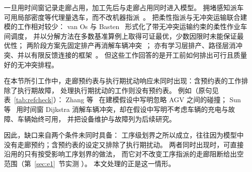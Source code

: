 一旦用时间窗记录走廊占用，加工先后与走廊占用同时进入模型。
拥堵感知派车可用局部密度等代理量选车，而不改机器指派~\cite{kim2026congestion}。
把柔性指派与无冲突运输联合建模的工作相对较少：
van Os 与 Basten~\cite{vanos2026exact} 形式化了带无冲突运输约束的柔性作业车间调度，
并以分解方法在多数基准算例上取得可证最优，少数因限时未能保证最优性；
两阶段方案先固定排产再消解车辆冲突~\cite{sun2023integrated}；
亦有学习层排产、路径层消冲突、并以有限反馈连接的框架~\cite{li2026framework}。
但这些工作回答的是开工前如何排出可行且质量好的无冲突排程。

在本节所引工作中，走廊预约表与执行期扰动响应未同时出现：含预约表的工作排除了执行期故障，
处理执行期扰动的工作则没有预约表。
例如（原句见表~\ref{tab:refcheck}）：
Zhang 等~\cite{zhang2023energy} 在建模假设中写明忽略 AGV 之间的碰撞；
Sun 等~\cite{sun2023integrated}
用时间窗 Dijkstra 消解车辆冲突，却在假设中写明不考虑车辆的充电与故障、车辆始终可用，
并把设备维护与故障列为后续研究。

因此，缺口来自两个条件未同时具备：
工序级划界之所以成立，往往因为模型中没有走廊预约；含预约表的设定又排除了执行期扰动。
两者同时出现时，可直接沿用的只有按受影响工序划界的做法，
而它对不改变工序指派的走廊阻断给出空范围（第~\ref{sec:e1}~节实测 \PassMiss）。
本文处理的正是这一情形。

